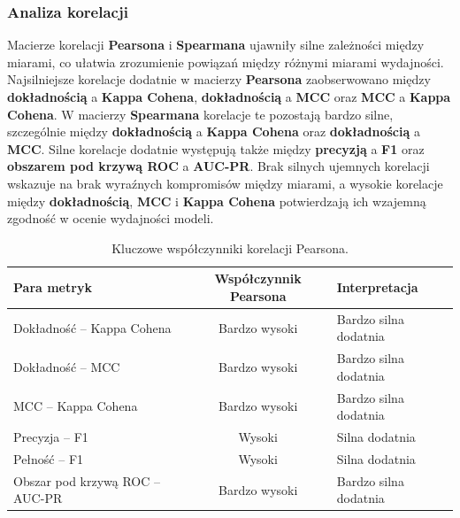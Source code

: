 \subsubsection{Analiza korelacji}

Macierze korelacji \textbf{Pearsona} i \textbf{Spearmana} ujawniły silne zależności między miarami, co ułatwia zrozumienie powiązań między różnymi miarami wydajności. Najsilniejsze korelacje dodatnie w macierzy \textbf{Pearsona} zaobserwowano między \textbf{dokładnością} a \textbf{Kappa Cohena}, \textbf{dokładnością} a \textbf{MCC} oraz \textbf{MCC} a \textbf{Kappa Cohena}. W macierzy \textbf{Spearmana} korelacje te pozostają bardzo silne, szczególnie między \textbf{dokładnością} a \textbf{Kappa Cohena} oraz \textbf{dokładnością} a \textbf{MCC}. Silne korelacje dodatnie występują także między \textbf{precyzją} a \textbf{F1} oraz \textbf{obszarem pod krzywą ROC} a \textbf{AUC-PR}. Brak silnych ujemnych korelacji wskazuje na brak wyraźnych kompromisów między miarami, a wysokie korelacje między \textbf{dokładnością}, \textbf{MCC} i \textbf{Kappa Cohena} potwierdzają ich wzajemną zgodność w ocenie wydajności modeli.

\begin{table}[H]
	\centering
	\caption{Kluczowe współczynniki korelacji Pearsona.}
	\label{tab:isot_pearson_correlations}
	\begin{tabular}{l c l}
		\toprule
		\textbf{Para metryk}            & \textbf{Współczynnik Pearsona} & \textbf{Interpretacja} \\
		\midrule
		Dokładność -- Kappa Cohena      & Bardzo wysoki                  & Bardzo silna dodatnia  \\
		Dokładność -- MCC               & Bardzo wysoki                  & Bardzo silna dodatnia  \\
		MCC -- Kappa Cohena             & Bardzo wysoki                  & Bardzo silna dodatnia  \\
		Precyzja -- F1                  & Wysoki                         & Silna dodatnia         \\
		Pełność -- F1                   & Wysoki                         & Silna dodatnia         \\
		Obszar pod krzywą ROC -- AUC-PR & Bardzo wysoki                  & Bardzo silna dodatnia  \\
		\bottomrule
	\end{tabular}
\end{table}

